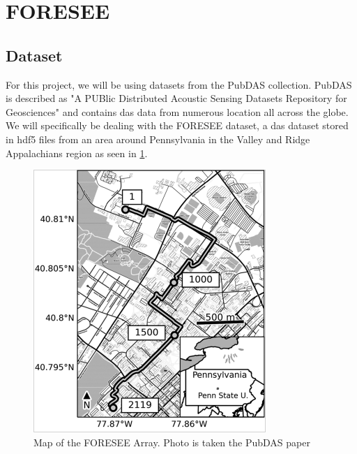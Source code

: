 \section{FORESEE}

\subsection{Dataset}

For this project, we will be using datasets from the PubDAS \cite{spica2023pubdas} collection. PubDAS is described as "A PUBlic Distributed Acoustic Sensing Datasets Repository for Geosciences" and contains \acrshort{das} data from numerous location all across the globe. We will specifically be dealing with the FORESEE dataset, a \acrshort{das} dataset stored in \acrshort{hdf5} files from an area around Pennsylvania in the Valley and Ridge Appalachians region  as seen in \ref{fig:foresee}. \\

\begin{figure}[!h]
    \centering
    \includegraphics[width=0.5\linewidth]{figures/foresee.png}
    \caption{Map of the FORESEE Array. Photo is taken the PubDAS paper \cite{spica2023pubdas}}
    \label{fig:foresee}
\end{figure}

